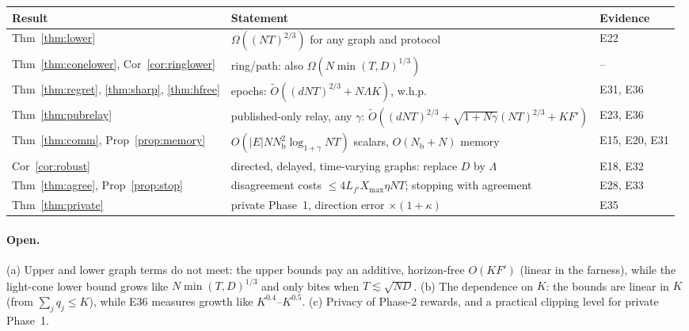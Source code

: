 \documentclass[11pt]{article}
\theoremstyle{definition}
\newcommand{\Nb}{N_{\mathrm b}}
\newcommand{\Xmax}{X_{\max}}
\begin{document}
\begin{center}
\small
\begin{tabular}{@{}lll@{}}
\toprule
Result & Statement & Evidence \\ \midrule
Thm~\ref{thm:lower} & $\Omega((NT)^{2/3})$ for any graph and protocol & E22 \\
Thm~\ref{thm:conelower}, Cor~\ref{cor:ringlower} & ring/path: also $\Omega(N\min(T,D)^{1/3})$ & -- \\
Thm~\ref{thm:regret}, \ref{thm:sharp}, \ref{thm:hfree} & epochs: $\tilde O((dNT)^{2/3}+N\Lambda K)$, w.h.p. & E31, E36 \\
Thm~\ref{thm:pubrelay} & published-only relay, any $\gamma$: $\tilde O((dNT)^{2/3}+\sqrt{1+N\gamma}(NT)^{2/3}+KF')$ & E23, E36 \\
Thm~\ref{thm:comm}, Prop~\ref{prop:memory} & $O(|E|N\Nb^2\log_{1+\gamma}NT)$ scalars, $O(\Nb+N)$ memory & E15, E20, E31 \\
Cor~\ref{cor:robust} & directed, delayed, time-varying graphs: replace $D$ by $\Lambda$ & E18, E32 \\
Thm~\ref{thm:agree}, Prop~\ref{prop:stop} & disagreement costs $\le4L_{f'}\Xmax\eta NT$; stopping with agreement & E28, E33 \\
Thm~\ref{thm:private} & private Phase~1, direction error $\times(1+\kappa)$ & E35 \\
\bottomrule
\end{tabular}
\end{center}

\paragraph{Open.} (a) Upper and lower graph terms do not meet: the upper bounds pay an additive, horizon-free $O(KF')$
(linear in the farness), while the light-cone lower bound grows like $N\min(T,D)^{1/3}$ and only bites when
$T\lesssim\sqrt{ND}$. (b) The dependence on $K$: the bounds are linear in $K$ (from $\sum_jq_j\le K$), while E36
measures growth like $K^{0.4}$--$K^{0.5}$. (c) Privacy of Phase-2 rewards, and a practical clipping level for private Phase~1.
\end{document}
